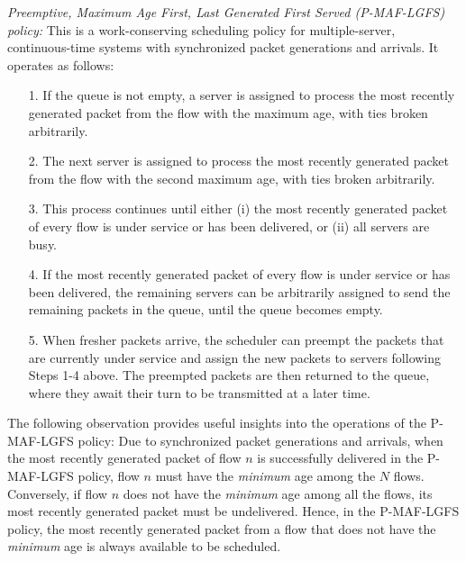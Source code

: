 \begin{definition} \emph{Preemptive, Maximum Age First, Last Generated First Served (P-MAF-LGFS) policy:} This is a work-conserving scheduling policy for multiple-server, continuous-time systems with synchronized packet generations and arrivals. It operates as follows:

\begin{itemize}
\item[1.] If the queue is not empty, a server is assigned to process the most recently generated packet from the flow with the maximum age, with ties broken arbitrarily. 

\item[2.] The next server is assigned to process the most recently generated packet from the flow with the second maximum age, with ties broken arbitrarily. 

\item[3.] This process continues until either (i) the most recently generated packet of every flow is under service or has been delivered, or (ii) all servers are busy. 

\item[4.] If the most recently generated packet of every flow is under service or has been delivered, the remaining servers can be arbitrarily assigned to send the remaining packets in the queue, until the queue becomes empty.

\item[5.] When fresher packets arrive, the scheduler can preempt the packets that are currently under service and assign the new packets to servers following Steps 1-4 above. The preempted packets are then returned to the queue, where they await their turn to be transmitted at a later time.
\end{itemize}

\end{definition}

The following observation provides useful insights into the operations of the P-MAF-LGFS policy: Due to synchronized packet generations and arrivals,  when the most recently generated packet of flow $n$ is successfully delivered in the P-MAF-LGFS policy, flow $n$ must have the \emph{minimum} age among the $N$ flows. Conversely, if flow $n$ does not have the \emph{minimum} age among all the flows, its most recently generated packet must be undelivered. Hence, in the P-MAF-LGFS policy, the most recently generated packet from a flow that does not have the \emph{minimum} age  is always available to be scheduled. 

